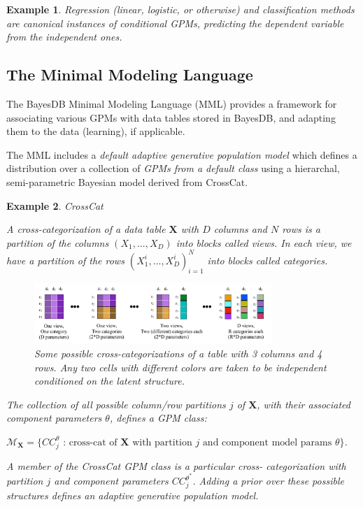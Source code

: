 \documentclass[10pt,letterpaper]{article}
\newtheorem{example}{Example}[section]
\newcommand{\set}[1]{\{#1\}}
\begin{document}
\begin{example}
Regression (linear, logistic, or otherwise) and classification methods
are canonical instances of conditional GPMs, predicting the dependent
variable from the independent ones.
\end{example}

\subsection{The Minimal Modeling Language}
\label{sec:mml}

The BayesDB Minimal Modeling Language (MML) provides a framework for
associating various GPMs with data tables stored in BayesDB, and
adapting them to the data (learning), if applicable.

The MML includes a \textit{default adaptive generative population
  model} which defines a distribution over a collection of
\textit{GPMs from a default class} using a hierarchal, semi-parametric
Bayesian model derived from CrossCat.

\begin{example} \label{ex:crosscat} CrossCat

A cross-categorization of a data table $\mathbf{X}$ with $D$ columns and $N$ 
rows is
a partition of the columns $(X_1,\dots,X_D)$ into blocks called \textit{views}.
In each view, we have a partition of the rows $(X_1^{i},\dots,X_D^{i})_{i=1}^N$
into blocks called \textit{categories}.

\begin{figure}[ht]
    \centering
\includegraphics[width=0.8\textwidth]{cc.jpeg}
\caption{Some possible cross-categorizations of a table with 3 columns
  and 4 rows.  Any two cells with different colors are taken to be
  independent conditioned on the latent structure.}
\label{fig:cc}
\end{figure}
The collection of all possible column/row partitions $j$ of
$\mathbf{X}$, with their associated component parameters $\theta$,
defines a GPM class:

$\mathcal{M}_\textbf{X} = \set{CC_j^{\theta} \text{ : cross-cat of } \mathbf{X}
\text{ with partition } j \text{ and component model params } \theta}$.

A member of the CrossCat GPM class is a particular
cross- categorization with partition $j$ and component parameters
$CC_j^{\theta^*}$.  Adding a prior over these possible structures
defines an adaptive generative population model.
\end{example}
\end{document}
